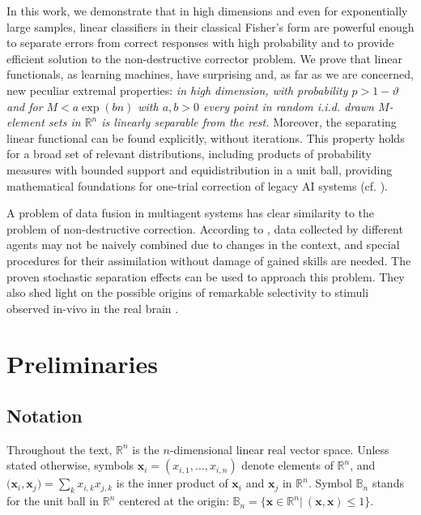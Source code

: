 \documentclass[final,5p,times,twocolumn]{elsarticle}
\newcommand{\Real}{\mathbb{R}}
\begin{document}
In this work, we demonstrate that in high dimensions and even for exponentially large samples, linear classifiers in their classical Fisher's form are powerful enough to separate errors from correct responses with high probability and to provide efficient solution to the non-destructive corrector problem.
We prove that linear functionals, as learning machines, have surprising and, as far as we are concerned, new peculiar extremal properties: {\it in high dimension, with probability $p>1-\vartheta$ and for $M<a\exp(b{n})$ with $a,b>0$ every point in random i.i.d. drawn $M$-element sets in $\mathbb{R}^n$ is linearly separable from the rest.} Moreover, the separating linear functional can be found explicitly, without iterations. This  property holds for a broad set of relevant distributions, including products of probability measures with bounded support and equidistribution in a unit ball, providing mathematical foundations for one-trial correction of legacy AI systems  (cf. \citep{GorbanRomBurtTyu2016}).

 A problem of data fusion in multiagent systems has clear similarity to the problem of non-destructive correction. According to \cite{Forney2009}, data collected by different agents may not be naively combined due to changes in the context, and special procedures for their assimilation without damage of gained skills are needed. The proven stochastic separation effects can be used to approach this problem.  They also shed light on the possible origins of remarkable selectivity to stimuli observed in-vivo in the real brain \citep{Quiroga2005}.

\section{Preliminaries}

\subsection{Notation}

Throughout the text,  $\Real^n$ is the $n$-dimensional linear real vector space. Unless stated otherwise, symbols $\boldsymbol{x}_i=(x_{i,1},\dots,x_{i,n})$ denote elements of $\Real^n$, and $\big(\boldsymbol{x}_i,\boldsymbol{x}_j\big)=\sum_{k} x_{i,k} x_{j,k}$ is the inner product of $\boldsymbol{x}_i$ and $\boldsymbol{x}_j$ in $\Real^n$. Symbol $\mathbb{B}_n$ stands for the unit ball in $\Real^n$ centered at the origin: $\mathbb{B}_n=\{\boldsymbol{x}\in\Real^n| \ \left(\boldsymbol{x},\boldsymbol{x}\right)\leq 1\}$.
\end{document}
